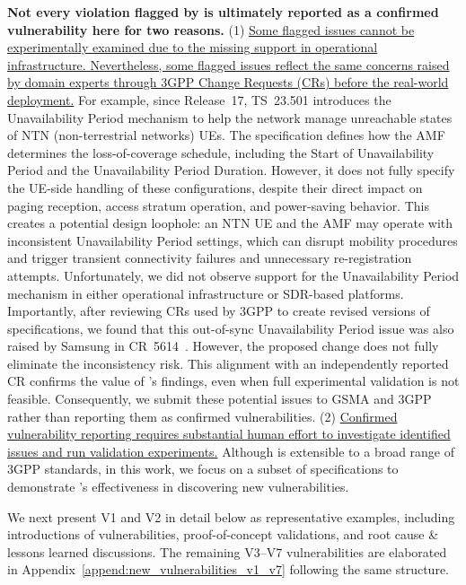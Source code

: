\noindent 
\textbf{Not every violation flagged by \lm is ultimately reported as a confirmed vulnerability here for two reasons.}
(1) \ul{Some flagged issues cannot be experimentally examined due to the missing support in operational infrastructure. Nevertheless, some flagged issues reflect the same concerns raised by domain experts through 3GPP Change Requests (CRs) before the real-world deployment.}
For example, since Release~17, TS~23.501 introduces the Unavailability Period mechanism to help the network manage unreachable states of NTN (non-terrestrial networks) UEs. 
The specification defines how the AMF determines the loss-of-coverage schedule, including the Start of Unavailability Period and the Unavailability Period Duration. 
However, it does not fully specify the UE-side handling of these configurations, despite their direct impact on paging reception, access stratum operation, and power-saving behavior. 
This creates a potential design loophole: an NTN UE and the AMF may operate with inconsistent Unavailability Period settings, which can disrupt mobility procedures and trigger transient connectivity failures and unnecessary re-registration attempts. 
Unfortunately, we did not observe support for the Unavailability Period mechanism in either operational infrastructure or SDR-based platforms. 
Importantly, after reviewing CRs used by 3GPP to create revised versions of specifications, we found that this out-of-sync Unavailability Period issue was also raised by Samsung in CR~5614~\cite{netovate_cr_search}. 
However, the proposed change does not fully eliminate the inconsistency risk. 
This alignment with an independently reported CR confirms the value of \lm's findings, even when full experimental validation is not feasible. 
Consequently, we submit these potential issues to GSMA and 3GPP rather than reporting them as confirmed vulnerabilities. 
(2) \ul{Confirmed vulnerability reporting requires substantial human effort to investigate identified issues and run validation experiments.} 
Although \lm is extensible to a broad range of 3GPP standards, in this work, we focus on a subset of specifications to demonstrate \lm's effectiveness in discovering new vulnerabilities. 

We next present V1 and V2 in detail below as representative examples, including introductions of vulnerabilities, proof-of-concept validations, and root cause \& lessons learned discussions. The remaining V3--V7 vulnerabilities are elaborated in Appendix~\ref{append:new_vulnerabilities_v1_v7} following the same structure.




